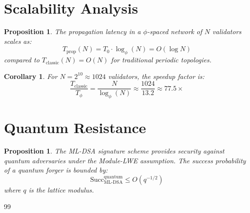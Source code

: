 \documentclass[12pt]{article}
\newtheorem lemma}[theorem]{Lemma}
\newtheorem{corollary}[theorem]{Corollary}
\newtheorem{prop}[theorem]{Proposition}
\begin{document}
\section{Scalability Analysis}

\begin{prop}
The propagation latency in a $\phi$-spaced network of $N$ validators scales as:
\begin{equation}
T_{\text{prop}}(N) = T_0 \cdot \log_{\phi}(N) = O(\log N)
\label{eq:latency}
\end{equation}
compared to $T_{\text{classic}}(N) = O(N)$ for traditional periodic topologies.
\end{prop}

\begin{corollary}
For $N = 2^{10} \approx 1024$ validators, the speedup factor is:
\begin{equation}
\frac{T_{\text{classic}}}{T_{\phi}} = \frac{N}{\log_{\phi}(N)} \approx \frac{1024}{13.2} \approx 77.5\times
\label{eq:speedup}
\end{equation}
\end{corollary}

\section{Quantum Resistance}

\begin{prop}
The ML-DSA signature scheme provides security against quantum adversaries under the Module-LWE assumption. The success probability of a quantum forger is bounded by:
\begin{equation}
\text{Succ}_{\text{ML-DSA}}^{\text{quantum}} \leq O(q^{-1/2})
\label{eq:ml_dsa}
\end{equation}
where $q$ is the lattice modulus.
\end{prop}

\begin{thebibliography}{99}

\end{thebibliography}
\end{document}
